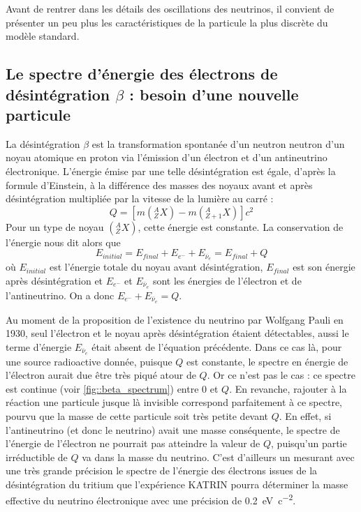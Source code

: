 		    Avant de rentrer dans les détails des oscillations des neutrinos, il convient de présenter un peu plus les caractéristiques de la particule la plus discrète du modèle standard.
		    		    
    
        \subsection{Le spectre d'énergie des électrons de désintégration \texorpdfstring{$\beta$}{b} : besoin d'une nouvelle particule}\label{sec::neutrino_origin}
        
	        La désintégration $\beta$ est la transformation spontanée d'un neutron neutron d'un noyau atomique en proton via l'émission d'un électron et d'un antineutrino électronique. L'énergie émise par une telle désintégration est égale, d'après la formule d'Einstein, à la différence des masses des noyaux avant et après désintégration multipliée par la vitesse de la lumière au carré : 
	        \begin{equation}
	        	Q = \left[m\left(^A_Z X\right)-m\left(^A_{Z+1} X\right)\right]c^2
	        \end{equation}
	        Pour un type de noyau $\left(^A_Z X\right)$, cette énergie est constante. La conservation de l'énergie nous dit alors que
	        \begin{equation}
	        	E_{initial} = E_{final} +E_{e^-}+E_{\overline{\nu}_e} = E_{final}+Q
	        \end{equation}
	        où $E_{initial}$ est l'énergie totale du noyau avant désintégration, $E_{final}$ est son énergie après désintégration et $E_{e^-}$ et $E_{\overline{\nu}_e}$ sont les énergies de l'électron et de l'antineutrino. On a donc $E_{e^-}+E_{\overline{\nu}_e} = Q$.
	        
	         Au moment de la proposition de l'existence du neutrino par Wolfgang Pauli en 1930\cite{Pauli1930}, seul l'électron et le noyau après désintégration étaient détectables, aussi le terme d'énergie $E_{\overline{\nu}_e}$ était absent de l'équation précédente. Dans ce cas là, pour une source radioactive donnée, puisque $Q$ est constante, le spectre en énergie de l'électron aurait due être très piqué atour de $Q$. Or ce n'est pas le cas : ce spectre est continue (voir \autoref{fig::beta_spectrum}) entre 0 et $Q$. En revanche, rajouter à la réaction une particule jusque là invisible correspond parfaitement à ce spectre, pourvu que la masse de cette particule soit très petite devant $Q$. En effet, si l'antineutrino (et donc le neutrino) avait une masse conséquente, le spectre de l'énergie de l'électron ne pourrait pas atteindre la valeur de $Q$, puisqu'un partie irréductible de $Q$ va dans la masse du neutrino. C'est d'ailleurs un mesurant avec une très grande précision le spectre de l'énergie des électrons issues de la désintégration du tritium que l'expérience KATRIN\cite{Kleesiek2018} pourra déterminer la masse effective du neutrino électronique avec une précision de \SI{0.2}{\electronvolt\per c\squared}.
    
